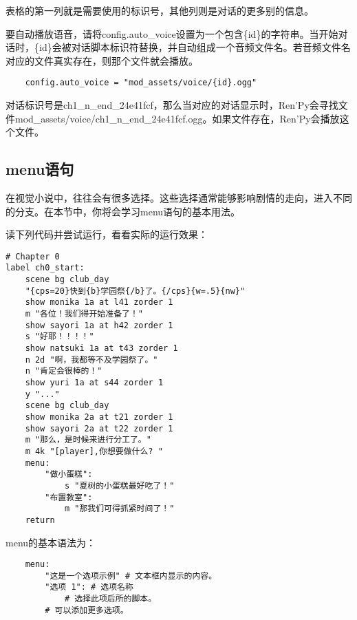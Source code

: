 表格的第一列就是需要使用的标识号，其他列则是对话的更多别的信息。

要自动播放语音，请将config.auto\_voice设置为一个包含\{id\}的字符串。当开始对话时，\{id\}会被对话脚本标识符替换，并自动组成一个音频文件名。若音频文件名对应的文件真实存在，则那个文件就会播放。

\begin{lstlisting}
    config.auto_voice = "mod_assets/voice/{id}.ogg"
\end{lstlisting}

对话标识号是ch1\_n\_end\_24e41fcf，那么当对应的对话显示时，Ren'Py会寻找文件mod\_assets/voice/ch1\_n\_end\_24e41fcf.ogg。如果文件存在，Ren'Py会播放这个文件。

\subsection{menu语句}
在视觉小说中，往往会有很多选择。这些选择通常能够影响剧情的走向，进入不同的分支。在本节中，你将会学习menu语句的基本用法。

读下列代码并尝试运行，看看实际的运行效果：
\begin{lstlisting}[caption=script-ch1.rpy]
# Chapter 0
label ch0_start:
    scene bg club_day
    "{cps=20}快到{b}学园祭{/b}了。{/cps}{w=.5}{nw}"
    show monika 1a at l41 zorder 1
    m "各位！我们得开始准备了！"
    show sayori 1a at h42 zorder 1
    s "好耶！！！！"
    show natsuki 1a at t43 zorder 1
    n 2d "啊，我都等不及学园祭了。"
    n "肯定会很棒的！"
    show yuri 1a at s44 zorder 1
    y "..."
    scene bg club_day
    show monika 2a at t21 zorder 1
    show sayori 2a at t22 zorder 1
    m "那么，是时候来进行分工了。"
    m 4k "[player],你想要做什么? "
    menu:
        "做小蛋糕":
            s "夏树的小蛋糕最好吃了！"
        "布置教室":
            m "那我们可得抓紧时间了！"
    return
\end{lstlisting}

menu的基本语法为：
\begin{lstlisting}
    menu:
        "这是一个选项示例" # 文本框内显示的内容。
        "选项 1": # 选项名称
            # 选择此项后所的脚本。
        # 可以添加更多选项。
\end{lstlisting}
